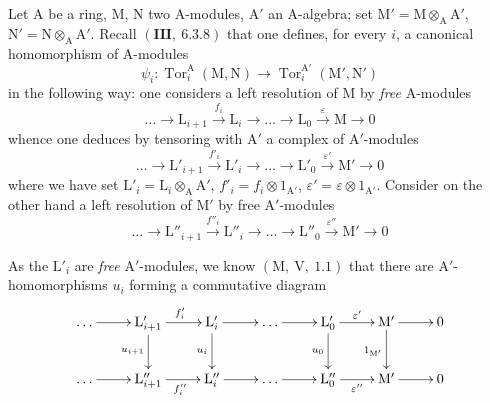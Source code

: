 \begin{env}[11.2.1]
\label{IV.11.2.1}
Let $\mathrm{A}$ be a ring, $\mathrm{M}$, $\mathrm{N}$ two A-modules, $\mathrm{A}'$ an A-algebra; set $\mathrm{M}'=\mathrm{M}\otimes_\mathrm{A}\mathrm{A}'$, $\mathrm{N}'=\mathrm{N}\otimes_\mathrm{A}\mathrm{A}'$. Recall $(\textbf{III},~6.3.8)$ that one defines, for every $i$, a canonical homomorphism of A-modules
\begin{equation}
  \psi_i:\operatorname{Tor}_i^\mathrm{A}(\mathrm{M},\mathrm{N})\to\operatorname{Tor}_i^{\mathrm{A}'}(\mathrm{M}',\mathrm{N}')
  \label{IV.11.2.1.1}
\tag{11.2.1.1}
\end{equation}
in the following way: one considers a left resolution of $\mathrm{M}$ by \emph{free} A-modules
\begin{equation}
  \ldots\longrightarrow\mathrm{L}_{i+1}\xrightarrow{f_i}\mathrm{L}_i\longrightarrow\ldots\longrightarrow\mathrm{L}_0\xrightarrow{\varepsilon}\mathrm{M}\longrightarrow 0
  \label{IV.11.2.1.2}
\tag{11.2.1.2}
\end{equation}
whence one deduces by tensoring with $\mathrm{A}'$ a complex of $\mathrm{A}'$-modules
\begin{equation}
  \ldots\longrightarrow\mathrm{L}'_{i+1}\xrightarrow{f'_i}\mathrm{L}'_i\longrightarrow\ldots\longrightarrow\mathrm{L}'_0\xrightarrow{\varepsilon'}\mathrm{M}'\longrightarrow 0
  \label{IV.11.2.1.3}
\tag{11.2.1.3}
\end{equation}
where we have set $\mathrm{L}'_i=\mathrm{L}_i\otimes_\mathrm{A}\mathrm{A}'$, $f'_i=f_i\otimes 1_{\mathrm{A}'}$, $\varepsilon'=\varepsilon\otimes 1_{\mathrm{A}'}$. Consider on the other hand a left resolution of $\mathrm{M}'$ by free $\mathrm{A}'$-modules
\begin{equation}
  \ldots\longrightarrow\mathrm{L}''_{i+1}\xrightarrow{f''_i}\mathrm{L}''_i\longrightarrow\ldots\longrightarrow\mathrm{L}''_0\xrightarrow{\varepsilon''}\mathrm{M}'\longrightarrow 0
  \label{IV.11.2.1.4}
\tag{11.2.1.4}
\end{equation}
\end{env}


As the $\mathrm{L}'_i$ are \emph{free} $\mathrm{A}'$-modules, we know $(\mathrm{M},~\mathrm{V},~1.1)$ that there are $\mathrm{A}'$-homomorphisms $u_i$ forming a commutative diagram
\[
\xymatrix{
  \ldots \ar[r] & \mathrm{L}'_{i+1} \ar[r]^{f'_i} \ar[d]_{u_{i+1}} & \mathrm{L}'_i \ar[r] \ar[d]_{u_i} & \ldots \ar[r] & \mathrm{L}'_0 \ar[r]^{\varepsilon'} \ar[d]_{u_0} & \mathrm{M}' \ar[r] \ar[d]_{1_{\mathrm{M}'}} & 0 \\
  \ldots \ar[r] & \mathrm{L}''_{i+1} \ar[r]_{f''_i} & \mathrm{L}''_i \ar[r] & \ldots \ar[r] & \mathrm{L}''_0 \ar[r]_{\varepsilon''} & \mathrm{M}' \ar[r] & 0
}
\]

